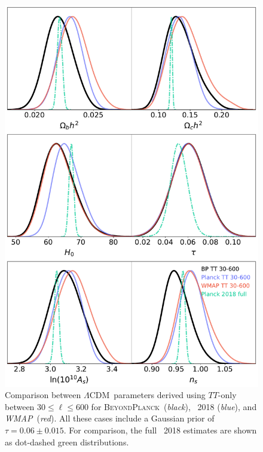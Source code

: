 \documentclass[twocolumn]{aa}
\def\WMAP{\textit{WMAP}}
\def\LCDM{$\Lambda$CDM}
\newcommand{\BP}{\textsc{BeyondPlanck}}
\begin{document}
\begin{figure}[t]
	\center
	\includegraphics[width=\linewidth]{figs/BP10_LCDM_30-600.pdf}
	\caption{Comparison between \LCDM\ parameters derived using
          $TT$-only between $30\le\ell\le600$ for
          \BP\ (\emph{black}), \Planck\ 2018 (\emph{blue}), and
          \WMAP\ (\emph{red}).  All these cases include a Gaussian
          prior of $\tau=0.06\pm0.015$.  For comparison, the full
          \Planck\ 2018 estimates are shown as dot-dashed green
          distributions.}
	\label{fig:GBR-600}	
\end{figure}
\end{document}

